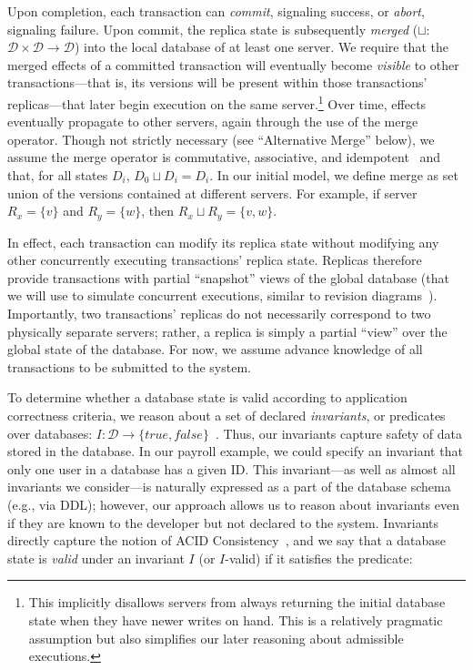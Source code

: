 Upon completion, each transaction can \textit{commit}, signaling
success, or \textit{abort}, signaling failure. Upon commit, the
replica state is subsequently \textit{merged} ($\sqcup$:${\mathcal D}
\times {\mathcal D} \rightarrow {\mathcal D}$) into the local database
of at least one server. We require that the merged effects of a
committed transaction will eventually become \textit{visible} to other
transactions---that is, its versions will be present within those
transactions' replicas---that later begin execution on the same
server.\footnote{This implicitly disallows servers from always
  returning the initial database state when they have newer writes on
  hand. This is a relatively pragmatic assumption but also simplifies
  our later reasoning about admissible executions.}  Over time,
effects eventually propagate to other servers, again through the use
of the merge operator.  Though not strictly necessary (see
``Alternative Merge'' below), we assume the
merge operator is commutative, associative, and
idempotent~\cite{calm,crdt} and that, for all states $D_i$, $D_0
\sqcup D_i = D_i$. In our initial model, we define merge
as set union of the versions contained at different servers. For
example, if server $R_x = \{v\}$ and $R_y = \{w\}$, then $R_x \sqcup
R_y = \{v, w\}$.

In effect, each transaction can modify its replica state without
modifying any other concurrently executing transactions' replica
state. Replicas therefore provide transactions with partial
``snapshot'' views of the global database (that we will use to
simulate concurrent executions, similar to revision
diagrams~\cite{ec-txns}). Importantly, two transactions' replicas do
not necessarily correspond to two physically separate servers; rather,
a replica is simply a partial ``view'' over the global state of the
database. For now, we assume advance knowledge of all transactions to
be submitted to the system.

 To determine whether a database state is valid
according to application correctness criteria, we reason about a set
of declared \textit{invariants}, or predicates over databases: $I:
{\mathcal D} \rightarrow \{true,
false\}$~\cite{eswaran-consistency}. Thus, our invariants capture
safety of data stored in the database. In our payroll example, we
could specify an invariant that only one user in a database has a
given ID. This invariant---as well as almost all invariants we
consider---is naturally expressed as a part of the database schema
(e.g., via DDL); however, our approach allows us to reason about
invariants even if they are known to the developer but not declared to
the system. Invariants directly capture the notion of ACID
Consistency~\cite{bernstein-book,gray-virtues}, and we say that a
database state is \textit{valid} under an invariant $I$ (or $I$-valid)
if it satisfies the predicate:

